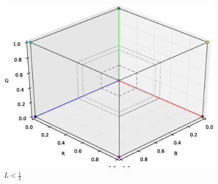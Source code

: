 \documentclass[a4paper,11pt]{jsarticle}
\numberwithin{theorem}{section}  %
\numberwithin{equation}{section} %
\begin{document}
\begin{figure}[H]
\includegraphics[width=12cm]{p3_2b.ps}
\caption{$L<\frac{1}{2}$}
\end{figure}
\end{document}
